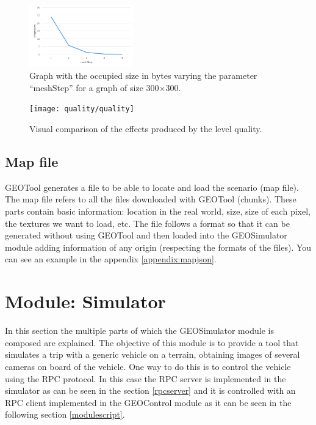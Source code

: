 \documentclass[10pt,a4paper,twocolumn,twoside]{article}
\begin{document}
\begin{figure}[h]
\centering
  	\includegraphics[width=0.4\textwidth]{qualitatmegas}
	\caption{Graph with the occupied size in bytes varying the parameter ``meshStep'' for a graph of size 300$\times$300.}
	\label{fig-qualitatmegas}
\end{figure}

\begin{figure}[h]
\centering
  	\texttt{[image: quality/quality]}
	\caption{Visual comparison of the effects produced by the level quality.}
	\label{fig-qualityvisual}
\end{figure}

\subsection{Map file}
 
GEOTool generates a file to be able to locate and load the scenario (map file). The map file refers to all the files downloaded with GEOTool (chunks). These parts contain basic information: location in the real world, size, size of each pixel, the textures we want to load, etc. The file follows a format so that it can be generated without using GEOTool and then loaded into the GEOSimulator module adding information of any origin (respecting the formats of the files). You can see an example in the appendix \ref{appendix:mapjson}.

\section{Module: Simulator}

In this section the multiple parts of which the GEOSimulator module is composed are explained. The objective of this module is to provide a tool that simulates a trip with a generic vehicle on a terrain, obtaining images of several cameras on board of the vehicle. One way to do this is to control the vehicle using the RPC protocol. In this case the RPC server is implemented in the simulator as can be seen in the section \ref{rpcserver} and it is controlled with an RPC client implemented in the GEOControl module as it can be seen in the following section \ref{modulescript}.
\end{document}
